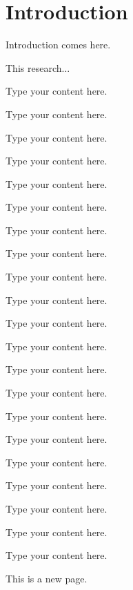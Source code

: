 %

\chapter{Introduction}

{
Introduction comes here.
}

This research...

Type your content here.

Type your content here.

Type your content here.

Type your content here.

Type your content here.

Type your content here.

Type your content here.

Type your content here.

Type your content here.

Type your content here.

Type your content here.

Type your content here.

Type your content here.

Type your content here.

Type your content here.

Type your content here.

Type your content here.

Type your content here.

Type your content here.

Type your content here.

Type your content here.

This is a new page.

\chapterend

